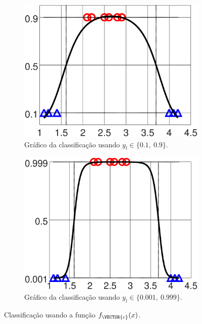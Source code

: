 \begin{figure}[!h]
    \begin{subfigure}[b]{0.45\textwidth}
        \centering
        \includegraphics[width=\textwidth]{chapters/classificacao/mfiles/reglogr1r1poly/ex1s1-reglogr1r1poly.eps}
        \caption{Gráfico da classificação usando $y_l \in \{0.1,~ 0.9\}$.}
        \label{fig:theo:reglogr1r1poly:xn:s1}
    \end{subfigure}
    \hfill
    \begin{subfigure}[b]{0.45\textwidth}
        \centering
        \includegraphics[width=\textwidth]{chapters/classificacao/mfiles/reglogr1r1poly/ex1s2-reglogr1r1poly.eps}
        \caption{Gráfico da classificação usando $y_l \in \{0.001,~ 0.999\}$.}
        \label{fig:theo:reglogr1r1poly:xn:s2}
    \end{subfigure}
    \caption{Classificação usando a função $f_{\VECTOR{c}}(x)$.}
    \label{fig:theo:reglogr1r1poly:xn}
\end{figure}


